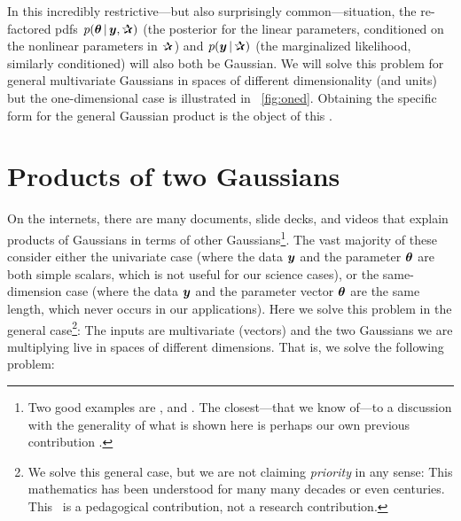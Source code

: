 In this incredibly restrictive---but also surprisingly
common---situation, the re-factored pdfs $p(\vtheta\given\vy,\bP)$
(the posterior for the linear parameters, conditioned on
the nonlinear parameters in $\bP$) and $p(\vy\given\bP)$ (the
marginalized likelihood, similarly conditioned) will also both be Gaussian.
We will solve this problem for general multivariate Gaussians in spaces
of different dimensionality (and units) but the one-dimensional case is
illustrated in \figurename~\ref{fig:oned}.
Obtaining the specific form for the general Gaussian product is the object of this
\documentname.

\section{Products of two Gaussians}\label{sec:problemsolution}

On the internets, there are many documents, slide decks, and videos
that explain products of Gaussians in terms of other Gaussians\footnote{Two
  good examples are \cite{roweis}, and \cite{cookbook}. The closest---that we know
  of---to a
  discussion with the generality of
  what is shown here is perhaps our own previous contribution \cite{luger}.}.
The vast majority of these consider either the univariate case (where
the data $\boldsymbol{y}$ and the parameter $\boldsymbol{\theta}$ are both simple scalars, which
is not useful for our science cases), or the same-dimension case (where the data
$\boldsymbol{y}$ and the parameter vector $\boldsymbol{\theta}$ are the same length, which never
occurs in our applications).
Here we solve this problem in the general case\footnote{We solve this general
  case, but we are not claiming \emph{priority} in any sense: This mathematics
  has been understood for many many decades or even centuries. This \documentname\ is
  a pedagogical contribution, not a research contribution.}:
The inputs are multivariate (vectors) and the two Gaussians we are
multiplying live in spaces of different dimensions.
That is, we solve the following problem:

